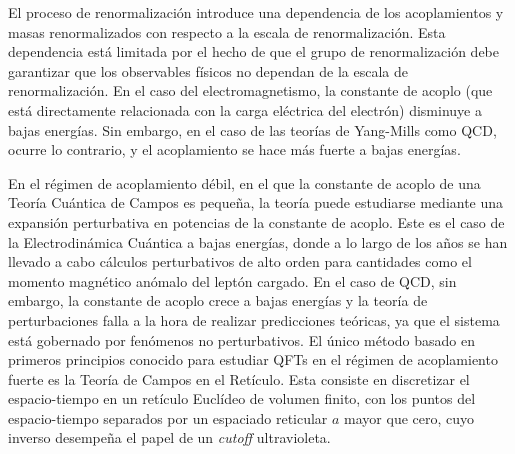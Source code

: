 El proceso de renormalización introduce una dependencia de los acoplamientos y masas renormalizados con respecto a la escala de renormalización. Esta dependencia está limitada por el hecho de que el grupo de renormalización debe garantizar que los observables físicos no dependan de la escala de renormalización.  En el caso del electromagnetismo, la constante de acoplo (que está directamente relacionada con la carga eléctrica del electrón) disminuye a bajas energías. Sin embargo, en el caso de las teorías de Yang-Mills como QCD, ocurre lo contrario, y el acoplamiento se hace más fuerte a bajas energías. 

En el régimen de acoplamiento débil, en el que la constante de acoplo de una Teoría Cuántica de Campos es pequeña, la teoría puede estudiarse mediante una expansión perturbativa en potencias de la constante de acoplo. Este es el caso de la Electrodinámica Cuántica a bajas energías, donde a lo largo de los años se han llevado a cabo cálculos perturbativos de alto orden para cantidades como el momento magnético anómalo del leptón cargado. En el caso de QCD, sin embargo, la constante de acoplo crece a bajas energías y la teoría de perturbaciones falla a la hora de realizar predicciones teóricas, ya que el sistema está gobernado por fenómenos no perturbativos. El único método basado en primeros principios conocido para estudiar QFTs en el régimen de acoplamiento fuerte es la Teoría de Campos en el Retículo. Esta consiste en discretizar el espacio-tiempo en un retículo Euclídeo de volumen finito, con los puntos del espacio-tiempo separados por un espaciado reticular $a$ mayor que cero, cuyo inverso desempeña el papel de un \textit{cutoff} ultravioleta. 


